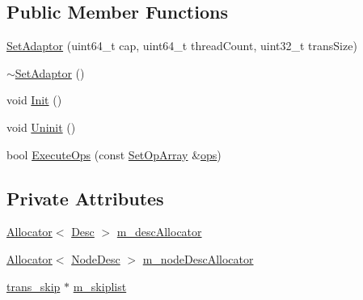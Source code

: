 \subsection*{Public Member Functions}
\begin{DoxyCompactItemize}
\item 
\hyperlink{classSetAdaptor_3_01trans__skip_01_4_a70793ce56d0b35ad32b8fdf9723e3fed}{Set\-Adaptor} (uint64\-\_\-t cap, uint64\-\_\-t thread\-Count, uint32\-\_\-t trans\-Size)
\item 
\hyperlink{classSetAdaptor_3_01trans__skip_01_4_a3737bfb7d1d13e91cd7688dd21ea86d4}{$\sim$\-Set\-Adaptor} ()
\item 
void \hyperlink{classSetAdaptor_3_01trans__skip_01_4_ad56122b123460a29c9372c1ad9cdaf40}{Init} ()
\item 
void \hyperlink{classSetAdaptor_3_01trans__skip_01_4_ae49af7d64d91647a660ba94e029ed437}{Uninit} ()
\item 
bool \hyperlink{classSetAdaptor_3_01trans__skip_01_4_a7a710fc23fd33466e92b1d06ad2e5869}{Execute\-Ops} (const \hyperlink{setadaptor_8h_a7af6ba4d94b446744e0e49accfb08e24}{Set\-Op\-Array} \&\hyperlink{stmskip_8cc_a91ee67dbc899b78fabcd2bfc4643d307}{ops})
\end{DoxyCompactItemize}
\subsection*{Private Attributes}
\begin{DoxyCompactItemize}
\item 
\hyperlink{classAllocator}{Allocator}$<$ \hyperlink{structDesc}{Desc} $>$ \hyperlink{classSetAdaptor_3_01trans__skip_01_4_ab1c58ed44975068b73118468a7ae56b2}{m\-\_\-desc\-Allocator}
\item 
\hyperlink{classAllocator}{Allocator}$<$ \hyperlink{structNodeDesc}{Node\-Desc} $>$ \hyperlink{classSetAdaptor_3_01trans__skip_01_4_a6011fb7888ade074791329b0ef855429}{m\-\_\-node\-Desc\-Allocator}
\item 
\hyperlink{structtrans__skip}{trans\-\_\-skip} $\ast$ \hyperlink{classSetAdaptor_3_01trans__skip_01_4_a35f19b9f0f48406537a0c224be5a3c67}{m\-\_\-skiplist}
\end{DoxyCompactItemize}



